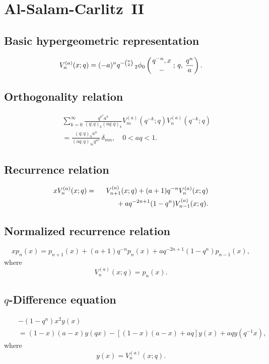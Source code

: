 \documentclass[envcountchap,graybox]{svmono}
\newcommand{\qhyp}[5]{\mbox{}_{#1}{\phi}_{#2}
\left(\genfrac{}{}{0pt}{}{#3}{#4}\,;\,q,\,#5\right)}
\newcommand{\mathindent}{\hspace{7.5mm}}
\begin{document}
\section{Al-Salam-Carlitz~II}
\par\setcounter{equation}{0}

\subsection*{Basic hypergeometric representation}
\begin{equation}
\label{DefAlSalamCarlitzII}
V_n^{(a)}(x;q)=
(-a)^nq^{-\binom{n}{2}}\,\qhyp{2}{0}{q^{-n},x}{-}{\frac{q^n}{a}}.
\end{equation}

\subsection*{Orthogonality relation}
\begin{eqnarray}
\label{OrtAlSalamCarlitzII}
& &\sum_{k=0}^{\infty}\frac{q^{k^2}a^k}{(q;q)_k(aq;q)_k}
V_m^{(a)}(q^{-k};q)V_n^{(a)}(q^{-k};q)\nonumber\\
& &{}=\frac{(q;q)_na^n}{(aq;q)_{\infty}q^{n^2}}\,\delta_{mn},\quad 0<aq<1.
\end{eqnarray}

\subsection*{Recurrence relation}
\begin{eqnarray}
\label{RecAlSalamCarlitzII}
xV_n^{(a)}(x;q)&=&V_{n+1}^{(a)}(x;q)+(a+1)q^{-n}V_n^{(a)}(x;q)\nonumber\\
& &{}\mathindent{}+aq^{-2n+1}(1-q^n)V_{n-1}^{(a)}(x;q).
\end{eqnarray}

\subsection*{Normalized recurrence relation}
\begin{equation}
\label{NormRecAlSalamCarlitzII}
xp_n(x)=p_{n+1}(x)+(a+1)q^{-n}p_n(x)+aq^{-2n+1}(1-q^n)p_{n-1}(x),
\end{equation}
where
$$V_n^{(a)}(x;q)=p_n(x).$$

\subsection*{$q$-Difference equation}
\begin{eqnarray}
\label{dvAlSalamCarlitzII}
& &-(1-q^n)x^2y(x)\nonumber\\
& &{}=(1-x)(a-x)y(qx)-\left[(1-x)(a-x)+aq\right]y(x)+aqy(q^{-1}x),
\end{eqnarray}
where
$$y(x)=V_n^{(a)}(x;q).$$
\end{document}
